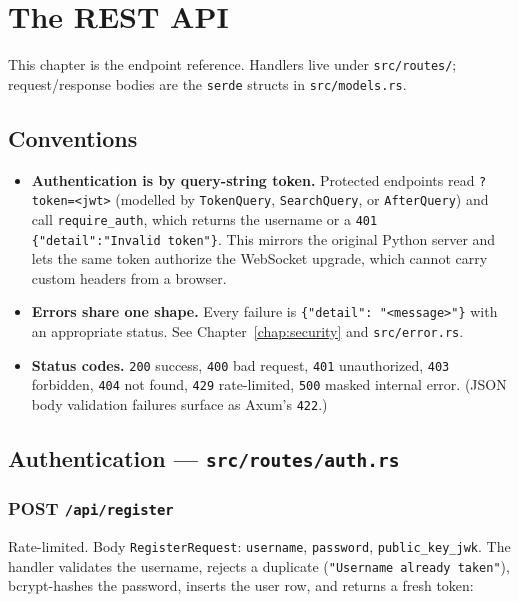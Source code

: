 \chapter{The REST API}
\label{chap:http-api}

This chapter is the endpoint reference. Handlers live under \verb|src/routes/|;
request/response bodies are the \verb|serde| structs in \verb|src/models.rs|.

\section{Conventions}

\begin{itemize}
  \item \textbf{Authentication is by query-string token.} Protected endpoints
        read \verb|?token=<jwt>| (modelled by \verb|TokenQuery|, \verb|SearchQuery|,
        or \verb|AfterQuery|) and call \verb|require_auth|, which returns the
        username or a \verb|401 {"detail":"Invalid token"}|. This mirrors the
        original Python server and lets the same token authorize the WebSocket
        upgrade, which cannot carry custom headers from a browser.
  \item \textbf{Errors share one shape.} Every failure is
        \verb|{"detail": "<message>"}| with an appropriate status. See
        Chapter~\ref{chap:security} and \verb|src/error.rs|.
  \item \textbf{Status codes.} \verb|200| success, \verb|400| bad request,
        \verb|401| unauthorized, \verb|403| forbidden, \verb|404| not found,
        \verb|429| rate-limited, \verb|500| masked internal error. (JSON body
        validation failures surface as Axum's \verb|422|.)
\end{itemize}

\section{Authentication --- \texttt{src/routes/auth.rs}}

\subsection*{POST \texttt{/api/register}}
Rate-limited. Body \verb|RegisterRequest|: \verb|username|, \verb|password|,
\verb|public_key_jwk|. The handler validates the username, rejects a duplicate
(\verb|"Username already taken"|), bcrypt-hashes the password, inserts the user
row, and returns a fresh token:

